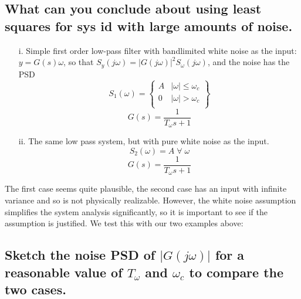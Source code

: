 \documentclass[12pt,letterpaper, onecolumn]{exam}
\begin{document}
\begin{questions}
\begin{parts}
        \part{What can you conclude about using least squares for sys id with large amounts of noise.}

    \end{parts}
    \clearpage
    \begin{itemize}
        \item[i.]{Simple first order low-pass filter with bandlimited white noise as the input:
        $y = G(s)\omega$, so that $S_y(j\omega) = \left\vert G(j\omega) \right\vert^2S_{\omega}(j\omega)$, and the noise has the PSD
        \[S_1(\omega) =
            \begin{Bmatrix}
                A & \vert \omega \vert \leq \omega_c \\
                0 & \vert \omega \vert > \omega_c    \\
            \end{Bmatrix} \]
        \[G(s) = \frac{1}{T_{\omega}s + 1} \]
        }
        \item[ii.]{The same low pass system, but with pure white noise as the input.
                    \[S_2(\omega) = A\;\forall\;\omega   \]
                    \[G(s) = \frac{1}{T_{\omega}s + 1} \]
              }
    \end{itemize}
    The first case seems quite plausible, the second case has an input with infinite variance and so is not physically realizable. However, the white noise assumption simplifies the system analysis significantly, so it is important to see if the assumption is justified. We test this with our two examples above:
    \clearpage
    \begin{parts}

        \part{Sketch the noise PSD of $\vert G(j\omega)\vert$ for a reasonable value of $T_\omega$ and $\omega_c$ to compare the two cases.}


\end{parts}
\end{questions}
\end{document}
